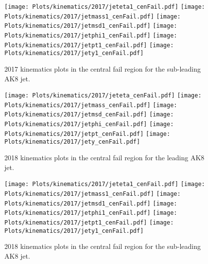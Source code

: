 \begin{figure}[htp]
	\begin{center}

		\texttt{[image: Plots/kinematics/2017/jeteta1\_cenFail.pdf]}
		\texttt{[image: Plots/kinematics/2017/jetmass1\_cenFail.pdf]}
		\texttt{[image: Plots/kinematics/2017/jetmsd1\_cenFail.pdf]}
		\texttt{[image: Plots/kinematics/2017/jetphi1\_cenFail.pdf]}
		\texttt{[image: Plots/kinematics/2017/jetpt1\_cenFail.pdf]}
		\texttt{[image: Plots/kinematics/2017/jety1\_cenFail.pdf]}

		\caption{2017 kinematics plots in the central fail region for the sub-leading AK8 jet.}
		\label{fig:kin2017_cenFail1}
	\end{center}
\end{figure}



\begin{figure}[htp]
	\begin{center}
		
		\texttt{[image: Plots/kinematics/2017/jeteta\_cenFail.pdf]}
		\texttt{[image: Plots/kinematics/2017/jetmass\_cenFail.pdf]}
		\texttt{[image: Plots/kinematics/2017/jetmsd\_cenFail.pdf]}
		\texttt{[image: Plots/kinematics/2017/jetphi\_cenFail.pdf]}
		\texttt{[image: Plots/kinematics/2017/jetpt\_cenFail.pdf]}
		\texttt{[image: Plots/kinematics/2017/jety\_cenFail.pdf]}
		
		\caption{2018 kinematics plots in the central fail region for the leading AK8 jet.}
		\label{fig:kin2018_cenFail}
	\end{center}
\end{figure}



\begin{figure}[htp]
	\begin{center}

		\texttt{[image: Plots/kinematics/2017/jeteta1\_cenFail.pdf]}
		\texttt{[image: Plots/kinematics/2017/jetmass1\_cenFail.pdf]}
		\texttt{[image: Plots/kinematics/2017/jetmsd1\_cenFail.pdf]}
		\texttt{[image: Plots/kinematics/2017/jetphi1\_cenFail.pdf]}
		\texttt{[image: Plots/kinematics/2017/jetpt1\_cenFail.pdf]}
		\texttt{[image: Plots/kinematics/2017/jety1\_cenFail.pdf]}

		\caption{2018 kinematics plots in the central fail region for the sub-leading AK8 jet.}
		\label{fig:kin2018_cenFail1}
	\end{center}
\end{figure}


